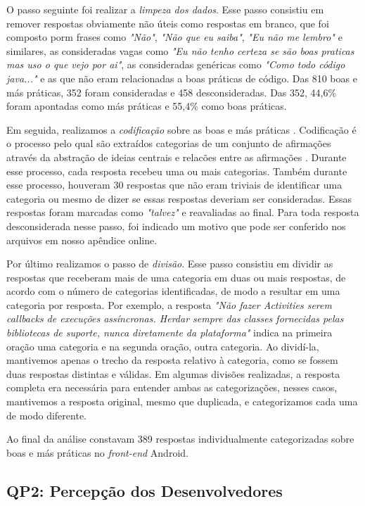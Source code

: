 O passo seguinte foi realizar a \textit{limpeza dos dados}. Esse passo consistiu em remover respostas obviamente não úteis como respostas em branco, que foi composto porm frases como \textit{"Não"}, \textit{"Não que eu saiba"}, \textit{"Eu não me lembro"} e similares, as consideradas vagas como \textit{"Eu não tenho certeza se são boas praticas mas uso o que vejo por ai"}, as consideradas genéricas como \textit{"Como todo código java..."} e as que não eram relacionadas a boas práticas de código. Das 810 boas e más práticas, 352 foram consideradas e 458 desconsideradas. Das 352, 44,6\% foram apontadas como más práticas e 55,4\% como boas práticas. 

Em seguida, realizamos a \textit{codificação} sobre as boas e más práticas \cite{Strauss2007,Saldana2013}. Codificação é o processo pelo qual são extraídos categorias de um conjunto de afirmações através da abstração de ideias centrais e relacões entre as afirmações \cite{Strauss2007}. Durante esse processo, cada resposta recebeu uma ou mais categorias. Também durante esse processo, houveram 30 respostas que não eram triviais de identificar uma categoria ou mesmo de dizer se essas respostas deveriam ser consideradas. Essas respostas foram marcadas como \textit{"talvez"} e reavaliadas ao final. Para toda resposta desconsiderada nesse passo, foi indicado um motivo que pode ser conferido nos arquivos em nosso apêndice online.

Por último realizamos o passo de \textit{divisão}. Esse passo consistiu em dividir as respostas que receberam mais de uma categoria em duas ou mais respostas, de acordo com o número de categorias identificadas, de modo a resultar em uma categoria por resposta. Por exemplo, a resposta \textit{"Não fazer Activities serem callbacks de execuções assíncronas. Herdar sempre das classes fornecidas pelas bibliotecas de suporte, nunca diretamente da plataforma"} indica na primeira oração uma categoria e na segunda oração, outra categoria. Ao dividí-la, mantivemos apenas o trecho da resposta relativo à categoria, como se fossem duas respostas distintas e válidas. Em algumas divisões realizadas, a resposta completa era necessária para entender ambas as categorizações, nesses casos, mantivemos a resposta original, mesmo que duplicada, e categorizamos cada uma de modo diferente. 

Ao final da análise constavam 389 respostas individualmente categorizadas sobre boas e más práticas no \textit{front-end} Android.


\subsection{QP2: Percepção dos Desenvolvedores}
\label{sub:perception}

